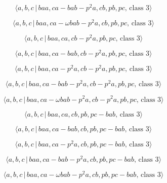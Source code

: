 \documentclass[10pt]{article}
\begin{document}
\begin{equation}
\langle a,b,c\,|\,baa,ca-bab-p^2a,cb,pb,pc,\,\text{class }3\rangle 
\tag{7.989}
\end{equation}

\begin{equation}
\langle a,b,c\,|\,baa,ca-\omega bab-p^{2}a,cb,pb,pc,\,\text{class }3\rangle 
\tag{7.990}
\end{equation}

\begin{equation}
\langle a,b,c\,|\,baa,ca,cb-p^2a,pb,pc,\,\text{class }3\rangle  \tag{7.991}
\end{equation}

\begin{equation}
\langle a,b,c\,|\,baa,ca-bab,cb-p^2a,pb,pc,\,\text{class }3\rangle 
\tag{7.992}
\end{equation}

\begin{equation}
\langle a,b,c\,|\,baa,ca-p^2a,cb-p^2a,pb,pc,\,\text{class }3\rangle 
\tag{7.993}
\end{equation}

\begin{equation}
\langle a,b,c\,|\,baa,ca-bab-p^2a,cb-p^2a,pb,pc,\,\text{class }3\rangle 
\tag{7.994}
\end{equation}

\begin{equation}
\langle a,b,c\,|\,baa,ca-\omega bab-p^{2}a,cb-p^{2}a,pb,pc,\,\text{class }%
3\rangle  \tag{7.995}
\end{equation}

\begin{equation}
\langle a,b,c\,|\,baa,ca,cb,pb,pc-bab,\,\text{class }3\rangle  \tag{7.996}
\end{equation}

\begin{equation}
\langle a,b,c\,|\,baa,ca-bab,cb,pb,pc-bab,\,\text{class }3\rangle 
\tag{7.997}
\end{equation}

\begin{equation}
\langle a,b,c\,|\,baa,ca-p^2a,cb,pb,pc-bab,\,\text{class }3\rangle 
\tag{7.998}
\end{equation}

\begin{equation}
\langle a,b,c\,|\,baa,ca-bab-p^2a,cb,pb,pc-bab,\,\text{class }3\rangle 
\tag{7.999}
\end{equation}

\begin{equation}
\langle a,b,c\,|\,baa,ca-\omega bab-p^{2}a,cb,pb,pc-bab,\,\text{class }%
3\rangle  \tag{7.1000}
\end{equation}
\end{document}
